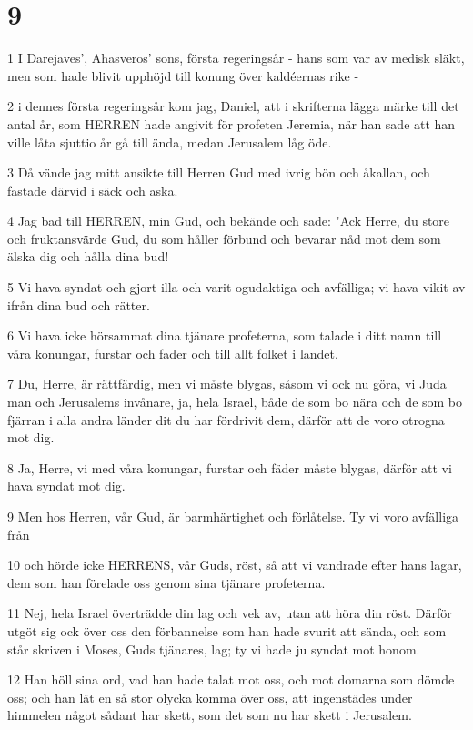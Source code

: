 \chapter{9}

\par 1 I Darejaves', Ahasveros' sons, första regeringsår - hans som var av medisk släkt, men som hade blivit upphöjd till konung över kaldéernas rike -
\par 2 i dennes första regeringsår kom jag, Daniel, att i skrifterna lägga märke till det antal år, som HERREN hade angivit för profeten Jeremia, när han sade att han ville låta sjuttio år gå till ända, medan Jerusalem låg öde.
\par 3 Då vände jag mitt ansikte till Herren Gud med ivrig bön och åkallan, och fastade därvid i säck och aska.
\par 4 Jag bad till HERREN, min Gud, och bekände och sade: "Ack Herre, du store och fruktansvärde Gud, du som håller förbund och bevarar nåd mot dem som älska dig och hålla dina bud!
\par 5 Vi hava syndat och gjort illa och varit ogudaktiga och avfälliga; vi hava vikit av ifrån dina bud och rätter.
\par 6 Vi hava icke hörsammat dina tjänare profeterna, som talade i ditt namn till våra konungar, furstar och fader och till allt folket i landet.
\par 7 Du, Herre, är rättfärdig, men vi måste blygas, såsom vi ock nu göra, vi Juda man och Jerusalems invånare, ja, hela Israel, både de som bo nära och de som bo fjärran i alla andra länder dit du har fördrivit dem, därför att de voro otrogna mot dig.
\par 8 Ja, Herre, vi med våra konungar, furstar och fäder måste blygas, därför att vi hava syndat mot dig.
\par 9 Men hos Herren, vår Gud, är barmhärtighet och förlåtelse. Ty vi voro avfälliga från
\par 10 och hörde icke HERRENS, vår Guds, röst, så att vi vandrade efter hans lagar, dem som han förelade oss genom sina tjänare profeterna.
\par 11 Nej, hela Israel överträdde din lag och vek av, utan att höra din röst. Därför utgöt sig ock över oss den förbannelse som han hade svurit att sända, och som står skriven i Moses, Guds tjänares, lag; ty vi hade ju syndat mot honom.
\par 12 Han höll sina ord, vad han hade talat mot oss, och mot domarna som dömde oss; och han lät en så stor olycka komma över oss, att ingenstädes under himmelen något sådant har skett, som det som nu har skett i Jerusalem.
